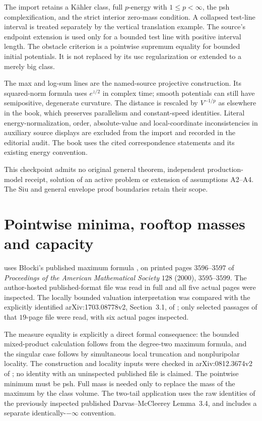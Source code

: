The import retains a K\"ahler class, full $p$-energy with
$1\leq p<\infty$, the psh complexification, and the
strict interior zero-mass condition. A collapsed test-line
interval is treated separately by the vertical translation
example. The source's endpoint extension is used only for
a bounded test line with positive interval length.
The obstacle criterion is a pointwise supremum equality
for bounded initial potentials. It is not replaced by
its usc regularization or extended to a merely big class.

The max and log-sum lines are the named-source projective
construction. Its squared-norm formula uses
$e^{z/2}$ in complex time; smooth potentials can still have
semipositive, degenerate curvature. The distance is rescaled
by $V^{-1/p}$ as elsewhere in the book, which preserves
parallelism and constant-speed identities.
Literal energy-normalization, order, absolute-value and
local-coordinate inconsistencies in auxiliary source displays
are excluded from the import and recorded in the editorial
audit. The book uses the cited correspondence statements
and its existing energy convention.

This checkpoint admits no original general theorem,
independent production-model receipt, solution of an active
problem or extension of assumptions A2--A4. The Siu and
general envelope proof boundaries retain their scope.

\section{Pointwise minima, rooftop masses and capacity}
\label{sec:provenance-minimum-mass}

 uses B\l ocki's published maximum
formula \cite[Theorem~4]{Blocki00Product}, on printed
pages $3596$--$3597$ of \emph{Proceedings of the American
Mathematical Society} $128$ (2000), $3595$--$3599$.
The author-hosted published-format file was read in full and
all five actual pages were inspected. The locally bounded
valuation interpretation was compared with the explicitly
identified arXiv:1703.08778v2, Section~3.1, of
\cite{Alesker17Valuations}; only selected passages of that
$19$-page file were read, with six actual pages inspected.

The measure equality is explicitly a direct formal consequence:
the bounded mixed-product calculation follows from the degree-two
maximum formula, and the singular case follows by simultaneous
local truncation and nonpluripolar locality. The construction and
locality inputs were checked in arXiv:0812.3674v2 of
\cite{BEGZ10}; no identity with an uninspected published file
is claimed. The pointwise minimum must be psh. Full mass is
needed only to replace the mass of the maximum by the class
volume. The two-tail application uses the raw identities of
the previously inspected published Darvas--McCleerey Lemma~3.4,
and includes a separate identically-$-\infty$ convention.

